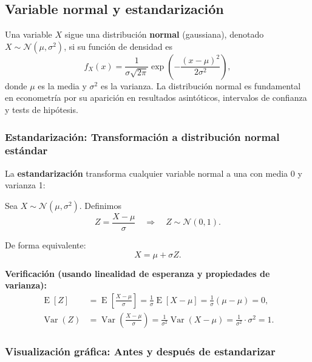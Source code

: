 \documentclass[11pt,a4paper]{article}
\DeclareMathOperator{\E}{E}
\DeclareMathOperator{\Var}{Var}
\begin{document}
\subsection{Variable normal y estandarización}

\begin{concepto}
Una variable \(X\) sigue una distribución \textbf{normal} (gaussiana), denotado \(X\sim\mathcal{N}(\mu,\sigma^2)\), si su función de densidad es
\[
f_X(x) = \frac{1}{\sigma\sqrt{2\pi}}\exp\left(-\frac{(x-\mu)^2}{2\sigma^2}\right),
\]
donde \(\mu\) es la media y \(\sigma^2\) es la varianza. La distribución normal es fundamental en econometría por su aparición en resultados asintóticos, intervalos de confianza y tests de hipótesis.
\end{concepto}

\subsubsection*{Estandarización: Transformación a distribución normal estándar}

La \textbf{estandarización} transforma cualquier variable normal a una con media 0 y varianza 1:

Sea \(X\sim\mathcal{N}(\mu,\sigma^2)\). Definimos
\[
\boxed{Z=\frac{X-\mu}{\sigma} \quad \Rightarrow \quad Z\sim\mathcal{N}(0,1)}.
\]

De forma equivalente:
\[
X=\mu+\sigma Z.
\]

\noindent\textbf{Verificación (usando linealidad de esperanza y propiedades de varianza):}
\begin{align}
\E[Z] &= \E\left[\frac{X-\mu}{\sigma}\right] = \frac{1}{\sigma}\E[X-\mu] = \frac{1}{\sigma}(\mu-\mu) = 0,\\
\Var(Z) &= \Var\left(\frac{X-\mu}{\sigma}\right) = \frac{1}{\sigma^2}\Var(X-\mu) = \frac{1}{\sigma^2}\cdot\sigma^2 = 1.
\end{align}

\subsubsection*{Visualización gráfica: Antes y después de estandarizar}
\end{document}
